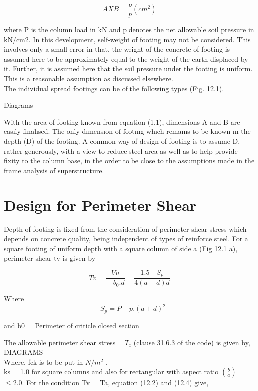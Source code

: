 \documentclass{book}
\begin{document}
\begin{equation}
AXB =\frac{p}{p} (cm^2)
\end{equation}

where P is the column load in kN and p denotes the net allowable soil pressure in kN/cm2. In
this development, self-weight of footing may not be considered. This involves only a small error
in that, the weight of the concrete of footing is assumed here to be approximately equal to the
weight of the earth displaced by it. Further, it is assumed here that the soil pressure under
the footing is uniform. This is a reasonable assumption as discussed elsewhere.\\
The individual spread footings can be of the following types (Fig. 12.1).
\newpage

\b Diagrams
\par With the area of footing known from equation (1.1), dimensions A and B are easily finalised. The only dimension of footing which remains to be known in the depth (D) of the footing. A common way of design of footing is to assume D, rather generously, with a view to reduce steel area as well as to help provide fixity to the column base, in the order to be close to the assumptions made in the frame analysis of superstructure.

\section{Design for Perimeter Shear}
Depth of footing is fixed from the consideration of perimeter shear stress which depends on concrete quality, being independent of types of reinforce steel. For a square footing of uniform depth with a square column of side a (Fig 12.1 a), perimeter shear tv is given by

\begin{equation}
Tv = \frac{Vu} {\quad{b_0}.d} 
=\frac{1.5 \quad S_p} {4(a+d)d} 
\end{equation}

Where 
\begin{equation}
\quad S_p = P-p . (a+d)^2
\end{equation}

and b0 = Perimeter of criticle closed section
\par The allowable perimeter shear stress
$\quad{T_a}$  
(clause 31.6.3 of the code) is given by,
\newpage
\b DIAGRAMS \\ 
Where, fck is to be put in $N/m^2$ .\\
 ks = 1.0 for square columns and also for rectangular with aspect ratio  $\left( \frac{b}{a} \right)$ $\leq {2.0}$. For the condition Tv = Ta, equation (12.2) and (12.4) give,
\end{document}

